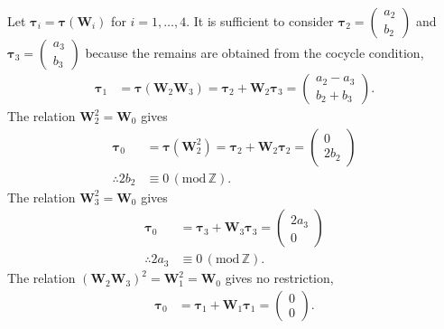 Let $\bm{\tau}_{i} = \bm{\tau}(\bm{W}_{i})$ for $i = 1, \dots, 4$.
It is sufficient to consider $\bm{\tau}_{2} = \begin{pmatrix} a_{2} \\ b_{2} \end{pmatrix}$ and $\bm{\tau}_{3} = \begin{pmatrix} a_{3} \\ b_{3} \end{pmatrix}$ because the remains are obtained from the cocycle condition,
\begin{align*}
  \bm{\tau}_{1}
    &= \bm{\tau}(\bm{W}_{2}\bm{W}_{3})
    = \bm{\tau}_{2} + \bm{W}_{2} \bm{\tau}_{3}
    = \begin{pmatrix} a_{2} - a_{3} \\ b_{2} + b_{3} \end{pmatrix}.
\end{align*}
The relation $\bm{W}_{2}^{2} = \bm{W}_{0}$ gives
\begin{align*}
  \bm{\tau}_{0}
    &= \bm{\tau}(\bm{W}_{2}^{2})
    = \bm{\tau}_{2} + \bm{W}_{2} \bm{\tau}_{2}
    = \begin{pmatrix} 0 \\ 2 b_{2} \end{pmatrix} \\
  \therefore 2b_{2} &\equiv 0 \, (\mathrm{mod}\, \mathbb{Z}).
\end{align*}
The relation $\bm{W}_{3}^{2} = \bm{W}_{0}$ gives
\begin{align*}
  \bm{\tau}_{0}
    &= \bm{\tau}_{3} + \bm{W}_{3} \bm{\tau}_{3}
    = \begin{pmatrix} 2 a_{3} \\ 0 \end{pmatrix} \\
  \therefore 2 a_{3} &\equiv 0 \, (\mathrm{mod}\, \mathbb{Z}).
\end{align*}
The relation $(\bm{W}_{2}\bm{W}_{3})^{2} = \bm{W}_{1}^{2} = \bm{W}_{0}$ gives no restriction,
\begin{align*}
  \bm{\tau}_{0}
    &= \bm{\tau}_{1} + \bm{W}_{1} \bm{\tau}_{1}
    = \begin{pmatrix} 0 \\ 0 \end{pmatrix}.
\end{align*}

